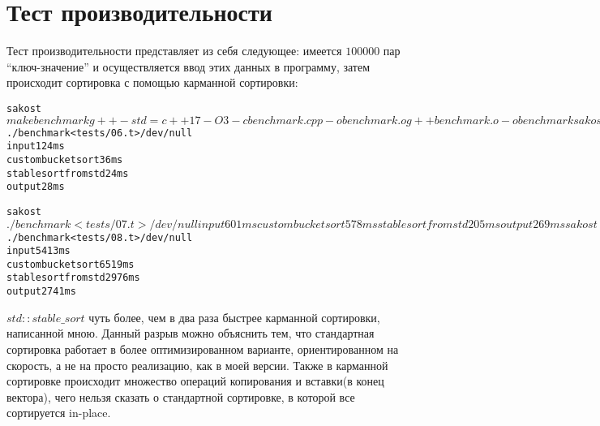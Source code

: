 \section{Тест производительности}

Тест производительности представляет из себя следующее: имеется $100000$ пар \enquote{ключ-значение} и осуществляется ввод этих данных в программу, затем происходит сортировка с помощью карманной сортировки:


\begin{alltt}
  sakost $ make benchmark
  g++ -std=c++17 -O3 -c benchmark.cpp -o benchmark.o
  g++ benchmark.o -o benchmark
  
  sakost $./benchmark < tests/06.t > /dev/null
  input 124 ms
  custom bucket sort 36 ms
  stable sort from std 24 ms
  output 28 ms
  
  sakost $./benchmark < tests/07.t > /dev/null
  input 601 ms
  custom bucket sort 578 ms
  stable sort from std 205 ms
  output 269 ms
  
  sakost $ ./benchmark < tests/08.t > /dev/null
  input 5413 ms
  custom bucket sort 6519 ms
  stable sort from std 2976 ms
  output 2741 ms 
  
\end{alltt}

$std::stable\_sort$ чуть более, чем в два раза быстрее карманной сортировки, написанной мною. Данный разрыв можно объяснить тем, что стандартная сортировка работает в более оптимизированном варианте, ориентированном на скорость, а не на просто реализацию, как в моей версии.
Также в карманной сортировке происходит множество операций копирования и вставки(в конец вектора), чего нельзя сказать о стандартной сортировке, в которой все сортируется in-place.
\pagebreak

